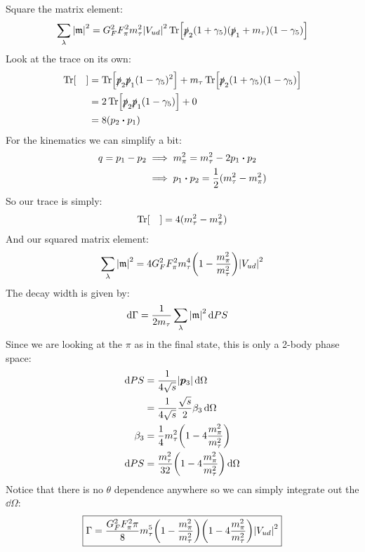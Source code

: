 \documentclass[12pt]{article}
\newcommand{\g}{\gamma}
\renewcommand{\sp}{\slashed{p}}
\newcommand{\m}{\mathfrak{m}}
\begin{document}
Square the matrix element:
\begin{align*}
  \sum_\lambda\abs{\m}^2=G_F^2F_\pi^2m_\tau^2\abs{V_{ud}}^2
  \Tr[\sp_2(1+\g_5)(\sp_1+m_\tau)(1-\g_5)]
\end{align*}
Look at the trace on its own:
\begin{align*}
  \Tr[\quad]&=\Tr[\sp_2\sp_1(1-\g_5)^2]+m_\tau\Tr[\sp_2(1+\g_5)(1-\g_5)]\\
  &=2\Tr[\sp_2\sp_1(1-\g_5)]+0\\
  &=8(p_2\vdot p_1)
\end{align*}
For the kinematics we can simplify a bit:
\begin{align*}
  q=p_1-p_2&\implies m_\pi^2=m_\tau^2-2p_1\vdot p_2\\
  &\implies p_1\vdot p_2=\frac{1}{2}(m_\tau^2-m_\pi^2)
\end{align*}
So our trace is simply:
\begin{align*}
  \Tr[\quad]=4(m_\tau^2-m_\pi^2)
\end{align*}
And our squared matrix element:
\begin{align*}
  \sum_\lambda\abs{\m}^2=4G_F^2F_\pi^2m_\tau^4\qty(1-\frac{m_\pi^2}{m_\tau^2})
  \abs{V_{ud}}^2
\end{align*}
The decay width is given by:
\begin{align*}
  \dd{\Gamma}&=\frac{1}{2m_\tau}\sum_\lambda\abs{\m}^2\dd{PS}
\end{align*}
Since we are looking at the $\pi$ as in the final state, this is only a 2-body phase space:
\begin{align*}
  \dd{PS}&=\frac{1}{4\sqrt{s}}\abs{\bm{p}_3}\dd{\Omega}\\
  &=\frac{1}{4\sqrt{s}}\frac{\sqrt{s}}{2}\beta_3\dd{\Omega}\\
  \beta_3&=\frac14m_\tau^2\qty(1-4\frac{m_\pi^2}{m_\tau^2})\\
  \dd{PS}&=\frac{m_\tau^2}{32}\qty(1-4\frac{m_\pi^2}{m_\tau^2})\dd{\Omega}
\end{align*}
Notice that there is no $\theta$ dependence anywhere so we can simply integrate out the $\dd{\Omega}$:
\begin{align*}
  \boxed{\Gamma=\frac{G_F^2F_\pi^2\pi}{8} m_\tau^5\qty(1-\frac{m_\pi^2}{m_\tau^2})
    \qty(1-4\frac{m_\pi^2}{m_\tau^2})\abs{V_{ud}}^2}
\end{align*}
\end{document}
